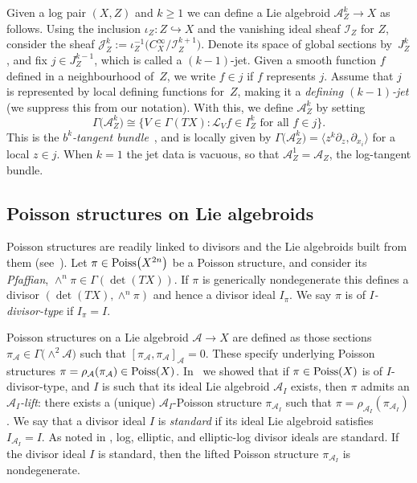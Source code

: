 \documentclass[pdftex]{sigma}
\numberwithin{equation}{section}
\begin{document}
Given a log pair $(X,Z)$ and $k \geq 1$ we can define a Lie algebroid $\mathcal{A}_Z^k \to X$ as follows. Using the inclusion $\iota_Z\colon Z \hookrightarrow X$ and the vanishing ideal sheaf $\mathcal{I}_Z$ for $Z$, consider the sheaf $\mathcal{J}_Z^k := \iota_Z^{-1}\big(C^\infty_X / \mathcal{I}_Z^{k+1}\big)$. Denote its space of global sections by~$J_Z^k$, and fix $j \in J_Z^{k-1}$, which is called a $(k-1)$-jet. Given a smooth function $f$ defined in a neighbourhood of~$Z$, we write $f \in j$ if $f$ represents $j$. Assume that $j$ is represented by local defining functions for~$Z$, making it a \emph{defining $(k-1)$-jet} (we suppress this from our notation). With this, we define $\mathcal{A}_Z^k$ by setting
\begin{displaymath}
\Gamma\big(\mathcal{A}_Z^k\big) \cong \big\{V \in \Gamma(TX)\colon \mathcal{L}_V f \in I_Z^k \text{ for all } f \in j\big\}.
\end{displaymath}
This is the \emph{$b^k$-tangent bundle}~\cite{Scott16}, and is locally given by $\Gamma\big(\mathcal{A}_Z^k\big) = \big\langle z^k \partial_z, \partial_{x_i} \big\rangle$ for a local $z \in j$. When $k = 1$ the jet data is vacuous, so that $\mathcal{A}_Z^1 = \mathcal{A}_Z$, the log-tangent bundle.

\subsection{Poisson structures on Lie algebroids} Poisson structures are readily linked to divisors and the Lie algebroids built from them (see~\cite{Klaasse18}). Let $\pi \in {\rm Poiss}\big(X^{2n}\big)$ be a Poisson structure, and consider its \emph{Pfaffian}, $\wedge^n \pi \in \Gamma(\det(TX))$. If $\pi$ is generically nondegenerate this defines a divisor $(\det(TX), \wedge^n \pi)$ and hence a divisor ideal $I_\pi$. We say $\pi$ is of \emph{$I$-divisor-type} if $I_\pi = I$.

Poisson structures on a Lie algebroid $\mathcal{A} \to X$ are defined as those sections $\pi_\mathcal{A} \in \Gamma\big({\wedge}^2 \mathcal{A}\big)$ such that $[\pi_\mathcal{A},\pi_\mathcal{A}]_\mathcal{A} = 0$. These specify underlying Poisson structures $\pi = \rho_\mathcal{A}(\pi_\mathcal{A}) \in {\rm Poiss}(X)$. In~\cite{Klaasse18} we showed that if $\pi \in {\rm Poiss}(X)$ is of $I$-divisor-type, and $I$ is such that its ideal Lie algebroid $\mathcal{A}_I$ exists, then $\pi$ admits an \emph{$\mathcal{A}_I$-lift}: there exists a (unique) $\mathcal{A}_I$-Poisson structure $\pi_{\mathcal{A}_I}$ such that $\pi = \rho_{\mathcal{A}_I}(\pi_{\mathcal{A}_I})$. We say that a divisor ideal $I$ is \emph{standard} if its ideal Lie algebroid satisfies $I_{\mathcal{A}_I} = I$. As noted in \cite{Klaasse18}, log, elliptic, and elliptic-log divisor ideals are standard. If the divisor ideal $I$ is standard, then the lifted Poisson structure $\pi_{\mathcal{A}_I}$ is nondegenerate.
\end{document}
